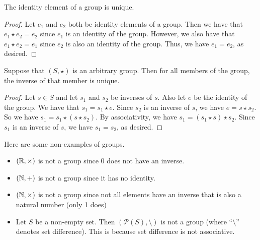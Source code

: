 \documentclass[main.tex]{subfiles}
\begin{document}
    \begin{prop}{}{}
        The identity element of a group is unique.
    \end{prop}
    \begin{proof}
        Let $e_1$ and $e_2$ both be identity elements of a group. Then we have that $e_1 \star e_2 = e_2$ since $e_1$ is an identity of the group. However, we also have that $e_1 \star e_2 = e_1$ since $e_2$ is also an identity of the group. Thus, we have $e_1 = e_2$, as desired.
    \end{proof}

    \begin{prop}{}{}
        Suppose that $(S, \star)$ is an arbitrary group. Then for all members of the group, the inverse of that member is unique.
    \end{prop}
    \begin{proof}
        Let $s\in S$ and let $s_1$ and $s_2$ be inverses of $s$. Also let $e$ be the identity of the group. We have that $s_1 = s_1 \star e$. Since $s_2$ is an inverse of $s$, we have $e = s\star s_2$. So we have $s_1 = s_1 \star (s \star s_2)$. By associativity, we have $s_1 = (s_1 \star s) \star s_2$. Since $s_1$ is an inverse of $s$, we have $s_1 = s_2$, as desired.
    \end{proof}

    \begin{example}{}{}
        Here are some non-examples of groups. 
        \begin{itemize}
            \item $(\mathbb{R}, \times)$ is not a group since $0$ does not have an inverse. 

            \item $(\mathbb{N}, +)$ is not a group since it has no identity. 

            \item $(\mathbb{N}, \times)$ is not a group since not all elements have an inverse that is also a natural number (only 1 does)

            \item Let $S$ be a non-empty set. Then $(\mathcal{P}(S), \setminus)$ is not a group (where ``$\setminus$'' denotes set difference). This is because set difference is not associative.
        \end{itemize}
    \end{example}
\end{document}
